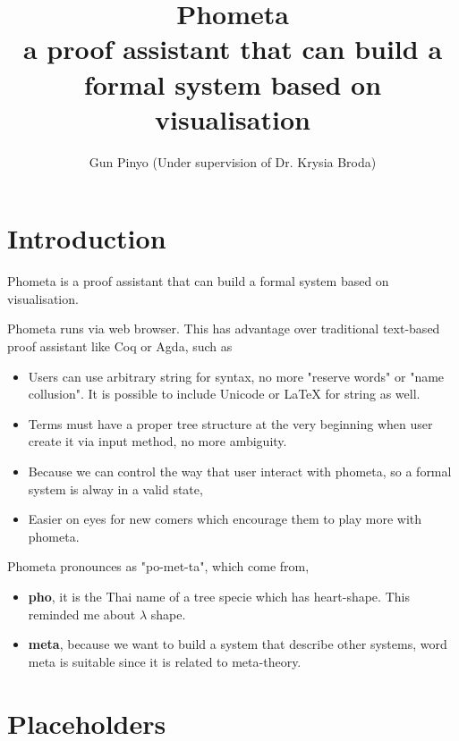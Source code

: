 \documentclass[11pt, a4paper]{article}
\begin{document}
\title{Phometa \\ a proof assistant that can build a formal system based on visualisation}
\author{
Gun Pinyo (Under supervision of Dr. Krysia Broda)
}
\maketitle




\section{Introduction}

Phometa is a proof assistant that can build a formal system based on visualisation.

Phometa runs via web browser. This has advantage over traditional text-based proof assistant like Coq or Agda, such as

\begin{itemize}
    \item Users can use arbitrary string for syntax, no more "reserve words" or "name collusion". It is possible to include Unicode or LaTeX for string as well.
    \item Terms must have a proper tree structure at the very beginning when user create it via input method, no more ambiguity.
    \item Because we can control the way that user interact with phometa, so a formal system is alway in a valid state,
    \item Easier on eyes for new comers which encourage them to play more with phometa.
\end{itemize}

Phometa pronounces as "po-met-ta", which come from,

\begin{itemize}
    \item \textbf{pho}, it is the Thai name of a tree specie which has heart-shape. This reminded me about $\lambda$ shape.
    \item \textbf{meta}, because we want to build a system that describe other systems, word meta is suitable since it is related to meta-theory.
\end{itemize}

\section{Placeholders}
\end{document}
